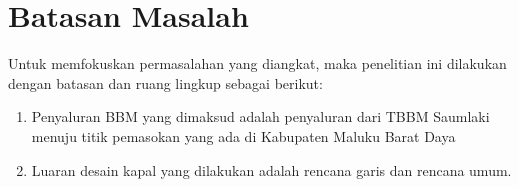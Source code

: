 \section{Batasan Masalah}
\label{sec:batasanmasalah}

Untuk memfokuskan permasalahan yang diangkat, maka penelitian ini dilakukan dengan batasan dan ruang lingkup sebagai berikut:
\begin{enumerate}
  \item Penyaluran BBM yang dimaksud adalah penyaluran dari TBBM Saumlaki menuju titik pemasokan yang ada di Kabupaten Maluku Barat Daya
  \item Luaran desain kapal yang dilakukan adalah rencana garis dan rencana umum.
\end{enumerate}
